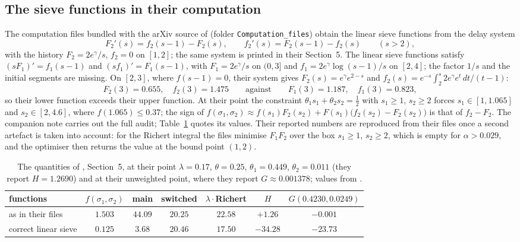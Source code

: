 \documentclass[11pt]{amsart}
\theoremstyle{remark}
\begin{document}
\subsection{The sieve functions in their computation}
The computation files bundled with the arXiv source of \cite{NX} (folder \texttt{Computation\_files}) obtain the linear sieve functions from the delay system
\[
F_2'(s)=f_2(s-1)-F_2(s),\qquad f_2'(s)=F_2(s-1)-f_2(s)\qquad(s>2),
\]
with the history $F_2=2e^\gamma/s$, $f_2=0$ on $[1,2]$; the same system is printed in their Section~5. The linear sieve functions satisfy $(sF_1)'=f_1(s-1)$ and $(sf_1)'=F_1(s-1)$, with $F_1=2e^\gamma/s$ on $(0,3]$ and $f_1=2e^\gamma\log(s-1)/s$ on $[2,4]$; the factor $1/s$ and the initial segments are missing. On $[2,3]$, where $f(s-1)=0$, their system gives $F_2(s)=e^\gamma e^{2-s}$ and $f_2(s)=e^{-s}\int_2^s2e^\gamma e^t\,dt/(t-1)$:
\[
F_2(3)=0.655,\quad f_2(3)=1.475\qquad\text{against}\qquad F_1(3)=1.187,\quad f_1(3)=0.823 ,
\]
so their lower function exceeds their upper function. At their point the constraint $\theta_1s_1+\theta_2s_2=\frac12$ with $s_1\ge1$, $s_2\ge2$ forces $s_1\in[1,1.065]$ and $s_2\in[2,4.6]$, where $f(1.065)\le0.37$; the sign of $f(\sigma_1,\sigma_2)\approx f(s_1)F_2(s_2)+F(s_1)\bigl(f_2(s_2)-F_2(s_2)\bigr)$ is that of $f_2-F_2$. The companion note \cite{ChenNX} carries out the full audit; Table~\ref{tab:nx} quotes its values. Their reported numbers are reproduced from their files once a second artefact is taken into account: for the Richert integral the files minimise $F_1F_2$ over the box $s_1\ge1$, $s_2\ge2$, which is empty for $\alpha>0.029$, and the optimiser then returns the value at the bound point $(1,2)$.

\begin{table}[htbp]
\centering\small
\begin{tabular}{lcccccc}
\toprule
functions & $f(\sigma_1,\sigma_2)$ & main & switched & $\lambda\cdot$Richert & $H$ & $G(0.4230,0.0249)$\\
\midrule
as in their files & $1.503$ & $44.09$ & $20.25$ & $22.58$ & $+1.26$ & $-0.001$\\
correct linear sieve & $0.125$ & $3.68$ & $20.46$ & $17.50$ & $-34.28$ & $-23.73$\\
\bottomrule
\end{tabular}
\caption{The quantities of \cite{NX}, Section~5, at their point $\lambda=0.17$, $\theta=0.25$, $\theta_1=0.449$, $\theta_2=0.011$ (they report $H=1.2690$) and at their unweighted point, where they report $G\approx0.001378$; values from \cite{ChenNX}.}
\label{tab:nx}
\end{table}
\end{document}
